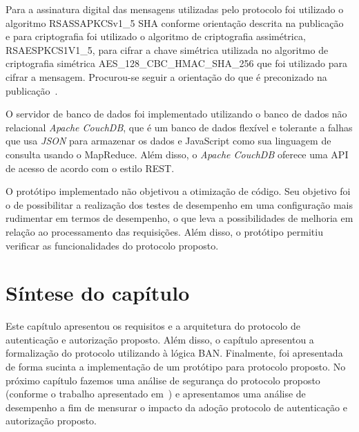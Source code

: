 Para a assinatura digital das mensagens utilizadas pelo protocolo foi utilizado o algoritmo RSASSA\-PKCS\-v1\_5 SHA conforme orientação descrita na publicação~\cite{ietfjws} e para criptografia foi utilizado o algoritmo de criptografia assimétrica, RSAES\-PKCS1\-V1\_5, para cifrar a chave simétrica utilizada no algoritmo de criptografia simétrica AES\_128\_CBC\_HMAC\_SHA\_256 que foi utilizado para cifrar a mensagem. Procurou-se seguir a orientação do que é preconizado na publicação~\cite{jwt2014}.

O servidor de banco de dados foi implementado utilizando o banco de dados não relacional \emph{Apache CouchDB}, que é um banco de dados flexível e tolerante a falhas que usa \emph{JSON} para armazenar os dados e JavaScript como sua linguagem de consulta usando o MapReduce. Além disso, o \emph{Apache CouchDB} oferece uma API de acesso de acordo com o estilo REST.

O protótipo implementado não objetivou a otimização de código. Seu objetivo foi o de possibilitar a realização dos testes de desempenho em uma configuração mais rudimentar em termos de desempenho, o que leva a possibilidades de melhoria em relação ao processamento das requisições. Além disso, o protótipo permitiu verificar as funcionalidades do protocolo proposto.


\section{Síntese do capítulo}

Este capítulo apresentou os requisitos e a arquitetura do protocolo de autenticação e autorização proposto. Além disso, o capítulo apresentou a formalização do protocolo utilizando à lógica BAN. Finalmente, foi apresentada de forma sucinta a implementação de um protótipo para protocolo proposto. No próximo capítulo fazemos uma análise de segurança do protocolo proposto (conforme o trabalho apresentado em~\cite{traust08}) e apresentamos uma análise de desempenho a fim de mensurar o impacto da adoção protocolo de autenticação e autorização proposto. %